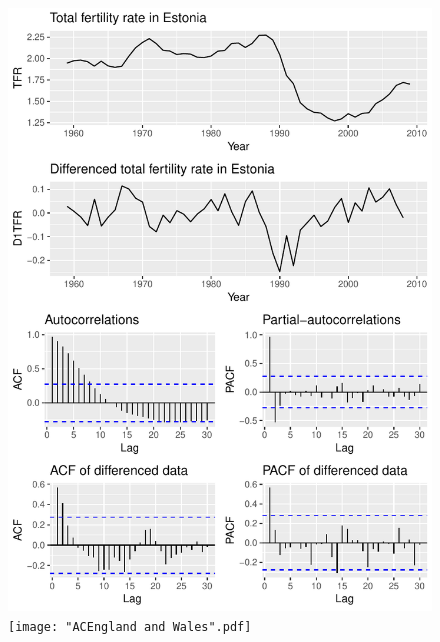 \documentclass[a4paper, 12pt]{scrartcl}
\begin{document}
\begin{figure}[h!]
	\centering
	\includegraphics[height=0.85\textwidth, angle=-90]{ACEstonia}
	\texttt{[image: "ACEngland and Wales".pdf]}
\end{figure}
\end{document}
